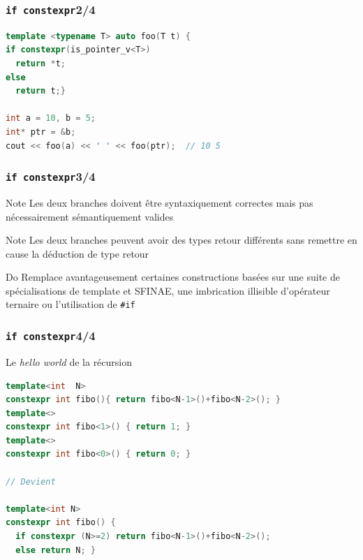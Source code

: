 \documentclass[C++.tex]{subfiles}
\begin{document}
\begin{frame}[fragile]
	\frametitle{\lstinline|if constexpr|\titlehfill{}2/4}
	\begin{lstlisting}[language=C++]
template <typename T> auto foo(T t) {
if constexpr(is_pointer_v<T>)
  return *t;
else
  return t;}

int a = 10, b = 5;
int* ptr = &b;
cout << foo(a) << ' ' << foo(ptr);  // 10 5\end{lstlisting}
\end{frame}

\begin{frame}[fragile]
	\frametitle{\lstinline|if constexpr|\titlehfill{}3/4}
	\begin{block}{Note}
		Les deux branches doivent être syntaxiquement correctes mais pas nécessairement sémantiquement valides
	\end{block}

	\begin{block}{Note}
		Les deux branches peuvent avoir des types retour différents sans remettre en cause la déduction de type retour
	\end{block}

	\begin{exampleblock}{Do}
		Remplace avantageusement certaines constructions basées sur une suite de spécialisations de template et SFINAE, une imbrication illisible d'opérateur ternaire ou l'utilisation de \lstinline|#if|
	\end{exampleblock}
\end{frame}

\begin{frame}[fragile]
	\frametitle{\lstinline|if constexpr|\titlehfill{}4/4}
	\begin{block}{Le \textit{hello world} de la récursion}
		\begin{lstlisting}[language=C++]
template<int  N>
constexpr int fibo(){ return fibo<N-1>()+fibo<N-2>(); }
template<>
constexpr int fibo<1>() { return 1; }
template<>
constexpr int fibo<0>() { return 0; }

// Devient

template<int N>
constexpr int fibo() {
  if constexpr (N>=2) return fibo<N-1>()+fibo<N-2>();
  else return N; }\end{lstlisting}
	\end{block}
\end{frame}
\end{document}
